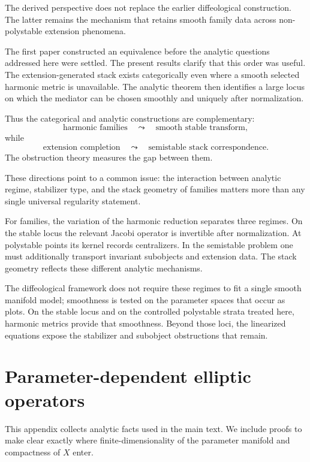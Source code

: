 \documentclass[11pt,reqno]{amsart}
\theoremstyle{definition}
\theoremstyle{remark}
\begin{document}
The derived perspective does not replace the earlier diffeological construction.  The latter remains the mechanism that retains smooth family data across non-polystable extension phenomena.


The first paper \cite{AzamRayan2026} constructed an equivalence before the analytic questions addressed here were settled.  The present results clarify that this order was useful.  The extension-generated stack exists categorically even where a smooth selected harmonic metric is unavailable.  The analytic theorem then identifies a large locus on which the mediator can be chosen smoothly and uniquely after normalization.

Thus the categorical and analytic constructions are complementary:
\[
  \text{harmonic families}
  \quad\leadsto\quad
  \text{smooth stable transform},
\]
while
\[
  \text{extension completion}
  \quad\leadsto\quad
  \text{semistable stack correspondence}.
\]
The obstruction theory measures the gap between them.


These directions point to a common issue: the interaction between analytic regime, stabilizer type, and the stack geometry of families matters more than any single universal regularity statement.


For families, the variation of the harmonic reduction separates three regimes.  On the stable locus the relevant Jacobi operator is invertible after normalization.  At polystable points its kernel records centralizers.  In the semistable problem one must additionally transport invariant subobjects and extension data.  The stack geometry reflects these different analytic mechanisms.

The diffeological framework does not require these regimes to fit a single smooth manifold model; smoothness is tested on the parameter spaces that occur as plots.  On the stable locus and on the controlled polystable strata treated here, harmonic metrics provide that smoothness.  Beyond those loci, the linearized equations expose the stabilizer and subobject obstructions that remain.

\appendix

\section{Parameter-dependent elliptic operators}\label{app:elliptic}

This appendix collects analytic facts used in the main text.  We include proofs to make clear exactly where finite-dimensionality of the parameter manifold and compactness of $X$ enter.
\end{document}

